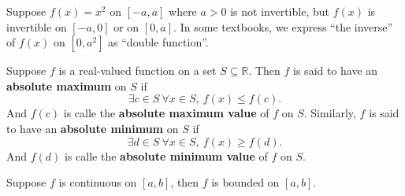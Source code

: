 \documentclass[a4paper]{ctexart}
\begin{document}
	\begin{myrmk}
		Suppose $f(x)=x^2$ on $[-a,a]$ where $a>0$ is not invertible, but $f(x)$ is invertible on $[-a,0]$ or on $[0,a]$. In some textbooks, we express ``the inverse'' of $f(x)$ on $[0,a^2]$ as ``double function''.
	\end{myrmk}

	\begin{mydef}
		Suppose $f$ is a real-valued function on a set $S\subseteq \mathbb{R}$. Then $f$ is said to have an \textbf{absolute maximum} on $S$ if
		\[
		\exists c \in S\ \forall x\in S,\ f(x)\le f(c).
		\]
		And $f(c)$ is calle the \textbf{absolute maximum value} of $f$ on $S$. Similarly, $f$ is said to have an \textbf{absolute minimum} on $S$ if
		\[
		\exists d \in S\ \forall x\in S,\ f(x)\ge f(d).
		\]
		And $f(d)$ is calle the \textbf{absolute minimum value} of $f$ on $S$.
	\end{mydef}
	\begin{mylma}
		Suppose $f$ is continuous on $[a,b]$, then $f$ is bounded on $[a,b]$.
	\end{mylma}
\end{document}
